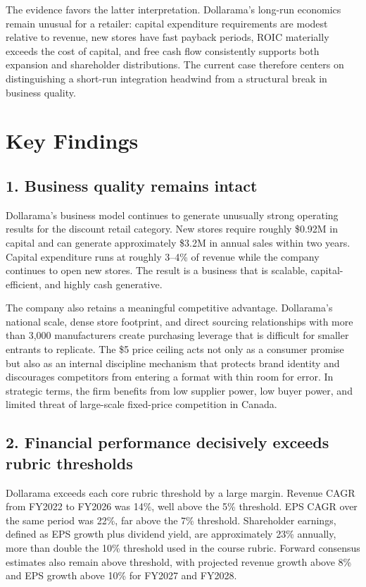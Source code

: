 \documentclass[11pt]{article}
\begin{document}
The evidence favors the latter interpretation. Dollarama's long-run economics remain unusual for a retailer: capital expenditure requirements are modest relative to revenue, new stores have fast payback periods, ROIC materially exceeds the cost of capital, and free cash flow consistently supports both expansion and shareholder distributions. The current case therefore centers on distinguishing a short-run integration headwind from a structural break in business quality.

\section{Key Findings}
\subsection{1. Business quality remains intact}
Dollarama's business model continues to generate unusually strong operating results for the discount retail category. New stores require roughly \$0.92M in capital and can generate approximately \$3.2M in annual sales within two years. Capital expenditure runs at roughly 3--4\% of revenue while the company continues to open new stores. The result is a business that is scalable, capital-efficient, and highly cash generative.

The company also retains a meaningful competitive advantage. Dollarama's national scale, dense store footprint, and direct sourcing relationships with more than 3,000 manufacturers create purchasing leverage that is difficult for smaller entrants to replicate. The \$5 price ceiling acts not only as a consumer promise but also as an internal discipline mechanism that protects brand identity and discourages competitors from entering a format with thin room for error. In strategic terms, the firm benefits from low supplier power, low buyer power, and limited threat of large-scale fixed-price competition in Canada.

\subsection{2. Financial performance decisively exceeds rubric thresholds}
Dollarama exceeds each core rubric threshold by a large margin. Revenue CAGR from FY2022 to FY2026 was 14\%, well above the 5\% threshold. EPS CAGR over the same period was 22\%, far above the 7\% threshold. Shareholder earnings, defined as EPS growth plus dividend yield, are approximately 23\% annually, more than double the 10\% threshold used in the course rubric. Forward consensus estimates also remain above threshold, with projected revenue growth above 8\% and EPS growth above 10\% for FY2027 and FY2028.
\end{document}
